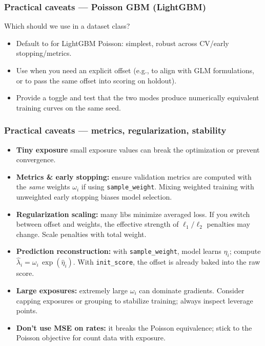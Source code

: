 \documentclass[10pt,aspectratio=169,xcolor={dvipsnames},usepdftitle=false]{beamer}
\begin{document}
\begin{frame}
\frametitle{Practical caveats — Poisson GBM (LightGBM)}
\begin{block}{Which should we use in a dataset class?}
\begin{itemize}
\item Default to  for LightGBM Poisson: simplest, robust across CV/early stopping/metrics.
\item Use  when you need an explicit offset (e.g., to align with GLM formulations, or to pass the same offset into scoring on holdout).
\item Provide a toggle and test that the two modes produce numerically equivalent training curves on the same seed.
\end{itemize}
\end{block}
\end{frame}

\begin{frame}
\frametitle{Practical caveats — metrics, regularization, stability}
\small
\begin{itemize}
\item \textbf{Tiny exposure} small exposure values can break the optimization or prevent convergence. 
\item \textbf{Metrics \& early stopping:} ensure validation metrics are computed with the \emph{same} weights $\omega_i$ if using \texttt{sample\_weight}. Mixing weighted training with unweighted early stopping biases model selection.
\item \textbf{Regularization scaling:} many libs minimize averaged loss. If you switch between offset and weights, the effective strength of $\ell_1/\ell_2$ penalties may change. Scale penalties with total weight.
\item \textbf{Prediction reconstruction:} with \texttt{sample\_weight}, model learns $\eta_i$; compute $\hat\lambda_i=\omega_i\,\exp(\hat\eta_i)$. With \texttt{init\_score}, the offset is already baked into the raw score.
\item \textbf{Large exposures:} extremely large $\omega_i$ can dominate gradients. Consider capping exposures or grouping to stabilize training; always inspect leverage points.
\item \textbf{Don’t use MSE on rates:} it breaks the Poisson equivalence; stick to the Poisson objective for count data with exposure.
\end{itemize}
\end{frame}
\end{document}
